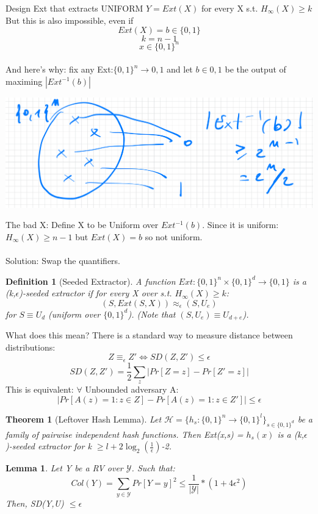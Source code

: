 \documentclass[11pt, a4paper]{article}
\newtheorem{thm}{Theorem}
\newtheorem{defn}{Definition}
\newtheorem{lem}{Lemma}
\begin{document}
Design Ext that extracts UNIFORM $Y=Ext(X)$ for every X s.t. $H_\infty (X) \geq k$\\
But this is also impossible, even if $$Ext(X)= b \in \{0,1\}$$ $$k = n-1$$ $$x \in \{0,1\}^n$$\\
And here's why: fix any Ext:$\{0,1\}^n \rightarrow {0,1}$ and let $b \in {0,1}$ be the output of maximing $|Ext^{-1}(b)|$\\
\begin{center}
    \includegraphics[scale=0.3]{img/expl.png}
\end{center}
The bad X: Define X to be Uniform over $Ext^{-1}(b)$. Since it is uniform: $H_\infty(X) \geq n-1$ but $Ext(X) = b$ so not uniform.\\\\
Solution: Swap the quantifiers.
\begin{defn}[Seeded Extractor]
    A function $Ext: \{0,1\}^n \times \{0,1\}^d \rightarrow \{0,1\}$ is a (k,$\epsilon$)-seeded extractor if for every X over s.t. $H_\infty(X) \geq k$: $$(S,Ext(S,X)) \approx_\epsilon (S,U_e)$$
    for $S \equiv U_d$ (uniform over $\{0,1\}^d$). (Note that $(S,U_e) \equiv U_{d+e}$).
\end{defn}
What does this mean? There is a standard way to measure distance between distributions:
$$ Z \equiv_\epsilon Z' \iff SD(Z,Z') \leq \epsilon$$
$$ SD(Z,Z') = \frac{1}{2} \sum_{z} |Pr[Z=z] - Pr[Z'=z]|$$
This is equivalent: $\forall$ Unbounded adversary A:
$$|Pr[A(z)=1 : z \in Z] - Pr[A(z)=1 : z \in Z']| \leq \epsilon$$
\begin{thm}[Leftover Hash Lemma]
    Let $\mathcal{H} = \{h_s: \{0,1\}^n \rightarrow \{0,1\}^l\}_{s \in \{0,1\}^d}$ be a family of pairwise independent hash functions. Then Ext(x,s) = $h_s(x)$ is a (k,$\epsilon$)-seeded extractor for k $\geq l + 2\log_2(\frac{1}{\epsilon})$-2.

\end{thm}
\begin{lem}
    Let Y be a RV over $\mathcal{Y}$. Such that:
    $$Col(Y) = \sum_{y \in \mathcal{Y}} Pr[Y=y]^2 \leq \frac{1}{|\mathcal{Y}|} * (1 + 4\epsilon^2)$$
    Then, SD(Y,U) $\leq \epsilon$
\end{lem}
\end{document}

